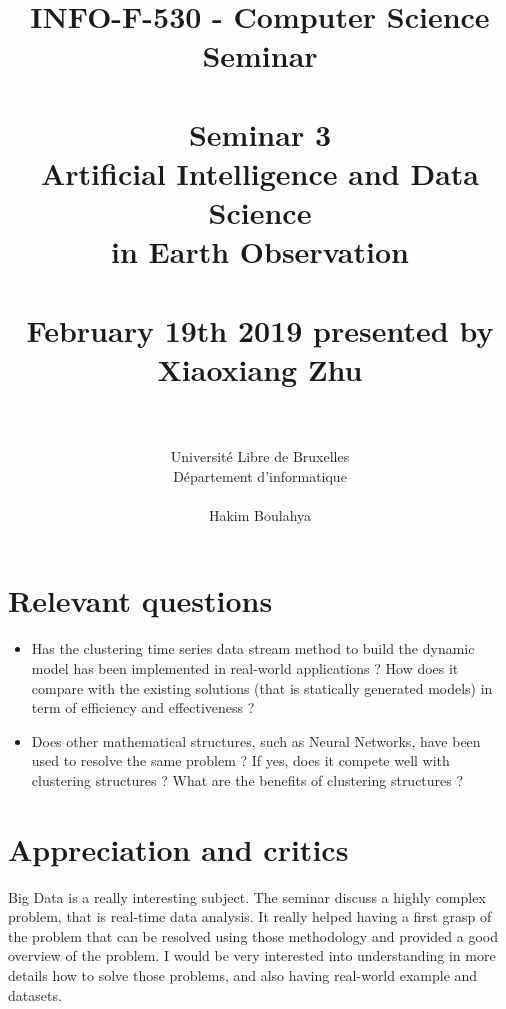 \documentclass[11pt,a4paper]{article}
\begin{document}
\section{Relevant questions}

\begin{itemize}
  \item Has the clustering time series data stream method to build the dynamic model has been implemented in real-world applications ? How does it compare with the existing solutions (that is statically generated models) in term of efficiency and effectiveness ?
  \item Does other mathematical structures, such as Neural Networks, have been used to resolve the same problem ? If yes, does it compete well with clustering structures ? What are the benefits of clustering structures ?
\end{itemize}

\section{Appreciation and critics}

Big Data is a really interesting subject. The seminar discuss a highly complex problem, that is real-time data analysis. It really helped having a first grasp of the problem that can be resolved using those methodology and provided a good overview of the problem. I would be very interested into understanding in more details how to solve those problems, and also having real-world example and datasets.




\title{
\large INFO-F-530 - Computer Science Seminar \\~\\
\LARGE Seminar 3 \\ Artificial Intelligence and Data Science \\ in Earth Observation \\~\\
\Large February 19th 2019 presented by Xiaoxiang Zhu \\~\\}
\author{Université Libre de Bruxelles \\
Département d'informatique \\
\\ Hakim Boulahya}
\maketitle
\end{document}
